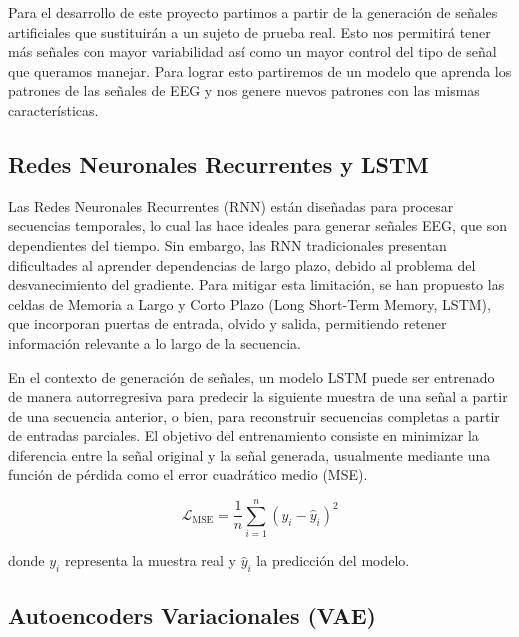 
Para el desarrollo de este proyecto partimos a partir de la generación de señales artificiales que sustituirán a un sujeto de prueba real. Esto nos permitirá tener más señales con mayor variabilidad así como un mayor control del tipo de señal que queramos manejar. Para lograr esto partiremos de un modelo que aprenda los patrones de las señales de EEG y nos genere nuevos patrones con las mismas características.

\subsection{Redes Neuronales Recurrentes y LSTM}

Las Redes Neuronales Recurrentes (RNN) están diseñadas para procesar secuencias temporales, lo cual las hace ideales para generar señales EEG, que son dependientes del tiempo. Sin embargo, las RNN tradicionales presentan dificultades al aprender dependencias de largo plazo, debido al problema del desvanecimiento del gradiente. Para mitigar esta limitación, se han propuesto las celdas de Memoria a Largo y Corto Plazo (Long Short-Term Memory, LSTM), que incorporan puertas de entrada, olvido y salida, permitiendo retener información relevante a lo largo de la secuencia.

En el contexto de generación de señales, un modelo LSTM puede ser entrenado de manera autorregresiva para predecir la siguiente muestra de una señal a partir de una secuencia anterior, o bien, para reconstruir secuencias completas a partir de entradas parciales. El objetivo del entrenamiento consiste en minimizar la diferencia entre la señal original y la señal generada, usualmente mediante una función de pérdida como el error cuadrático medio (MSE).

\begin{equation}
\mathcal{L}_{\text{MSE}} = \frac{1}{n} \sum_{i=1}^{n} \left( y_i - \hat{y}_i \right)^2
\end{equation}

donde $y_i$ representa la muestra real y $\hat{y}_i$ la predicción del modelo.

\subsection{Autoencoders Variacionales (VAE)}


